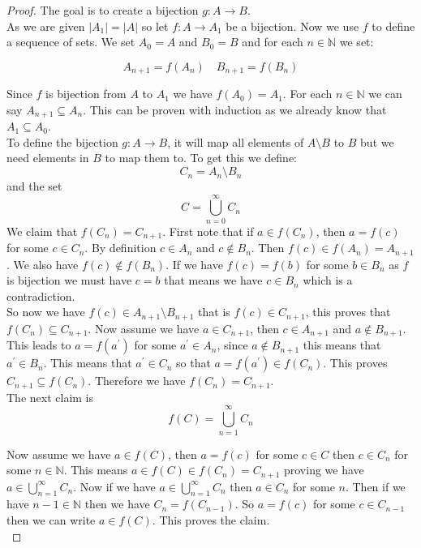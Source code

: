 \documentclass[16pt,a4paper]{article}
\theoremstyle{definition}
\begin{document}
\begin{proof}
The goal is to create a bijection $g:A\rightarrow B$. \\

As we are given $|A_1| = |A|$ so let $f:A  \rightarrow A_1$ be a bijection. Now we use $f$ to define a sequence of sets.  We set $A_0 = A$ and $B_0 = B$ and for each $n \in \mathbb{N}$ we set:

\[A_{n+1} = f(A_n)\quad B_{n+1} = f(B_n)\] 

Since $f$ is bijection from $A$ to $A_1$ we have $f(A_0) = A_1$. For each $n\in \mathbb{N}$ we can say $A_{n+1} \subseteq A_n$. This can be proven with induction as we already know that $A_1 \subseteq A_0$.   \\

To define the bijection $g:A\rightarrow B$, it will map all elements of $A\setminus B$ to $B$ but we need elements in $B$ to map them to.  To get this we define: 
\[C_n = A_n \setminus B_n\]
and the set 
\[C = \bigcup_{n=0}^{\infty}C_n\]
\newpage
We claim that $f(C_n) = C_{n+1}$. First note that if $a\in f(C_n)$, then $a= f(c)$ for some $c\in C_n$. By definition $c \in A_n$ and $c\notin B_n$. Then $f(c) \in f(A_n) = A_{n+1}$. We also have $f(c) \notin f(B_n)$. If we have $f(c) = f(b)$ for some $b\in B_n$ as $f$ is bijection we must have $c =b$ that means we have $c\in B_n$ which is a contradiction.\\

So now we have $f(c) \in A_{n+1}\setminus B_{n+1}$ that is $f(c) \in C_{n+1}$, this proves that $f(C_n) \subseteq C_{n+1}$. Now assume we have $a\in C_{n+1}$, then $c\in A_{n+1}$ and $a\notin B_{n+1}$. This leads to $a = f(a^\prime)$ for some $a^\prime \in A_n$, since $a\notin B_{n+1}$ this means that $a^\prime \in B_n $. This means that $a^\prime \in C_n$ so that $a = f(a^\prime) \in f(C_n)$. This proves $C_{n+1} \subseteq f(C_n)$. Therefore we have $f(C_n) = C_{n+1}$. 
\\ 

The next claim is 
\[f(C) = \bigcup_{n=1}^{\infty}C_n \]

Now assume we have $a \in f(C)$, then $a = f(c)$ for some $c \in C$ then $c \in C_n$ for some $n \in \mathbb{N}$. This means $a \in f(C) \in f(C_n) = C_{n+1}$ proving we have $a\in \bigcup_{n=1}^{\infty}C_n$.  Now if we have $a\in \bigcup_{n=1}^{\infty}C_n$ then $a \in C_n$ for some $n$. Then if we have $n-1 \in \mathbb{N}$ then we have $C_n = f(C_{n-1})$. So $a = f(c)$ for some $c \in C_{n-1}$ then we can write $a \in f(C)$. This proves the claim. 
\\


\end{proof}
\end{document}
